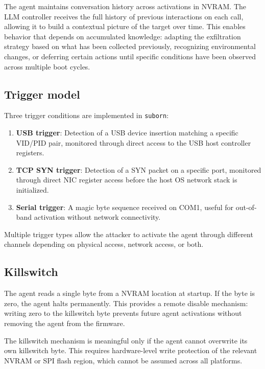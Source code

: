 \documentclass[11pt,a4paper]{article}
\begin{document}
The agent maintains conversation history across activations in NVRAM. The LLM controller receives the full history of previous interactions on each call, allowing it to build a contextual picture of the target over time. This enables behavior that depends on accumulated knowledge: adapting the exfiltration strategy based on what has been collected previously, recognizing environmental changes, or deferring certain actions until specific conditions have been observed across multiple boot cycles.

\subsection{Trigger model}

Three trigger conditions are implemented in \texttt{suborn}:

\begin{enumerate}[noitemsep]
\item \textbf{USB trigger}: Detection of a USB device insertion matching a specific VID/PID pair, monitored through direct access to the USB host controller registers.
\item \textbf{TCP SYN trigger}: Detection of a SYN packet on a specific port, monitored through direct NIC register access before the host OS network stack is initialized.
\item \textbf{Serial trigger}: A magic byte sequence received on COM1, useful for out-of-band activation without network connectivity.
\end{enumerate}

Multiple trigger types allow the attacker to activate the agent through different channels depending on physical access, network access, or both.

\subsection{Killswitch}

The agent reads a single byte from a NVRAM location at startup. If the byte is zero, the agent halts permanently. This provides a remote disable mechanism: writing zero to the killswitch byte prevents future agent activations without removing the agent from the firmware.

The killswitch mechanism is meaningful only if the agent cannot overwrite its own killswitch byte. This requires hardware-level write protection of the relevant NVRAM or SPI flash region, which cannot be assumed across all platforms.
\end{document}
